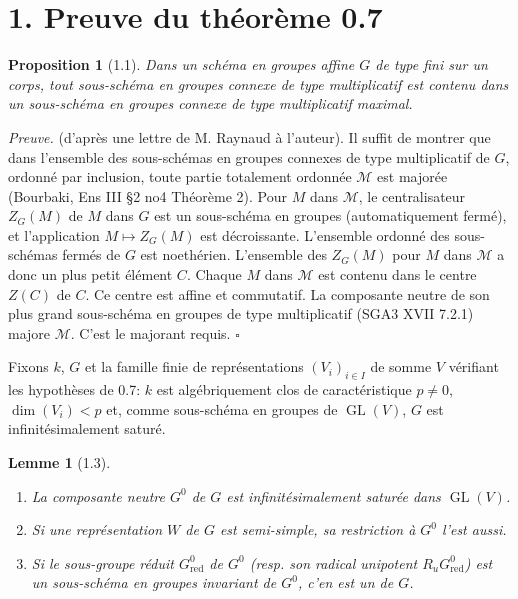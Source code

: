 \documentclass[10pt]{article}
\newcommand{\GL}{\operatorname{GL}}
\newcommand{\Ru}{R_u}
\newcommand{\red}{\mathrm{red}}
\theoremstyle{deligne}
\newtheorem*{proposition*}{Proposition}
\newtheorem*{lemma*}{Lemme}
\newenvironment{proofdel}{\textit{Preuve.}}{\hfill$\square$}
\newcommand{\heading}[1]{\vspace{0.7em}\noindent{\bfseries #1}\quad}
\begin{document}
\section*{1. Preuve du théorème 0.7}

\begin{proposition*}[1.1]
Dans un schéma en groupes affine \(G\) de type fini sur un corps, tout sous-schéma en groupes connexe de type multiplicatif est contenu dans un sous-schéma en groupes connexe de type multiplicatif maximal.
\end{proposition*}

\begin{proofdel}
(d'après une lettre de M. Raynaud à l'auteur). Il suffit de montrer que dans l'ensemble des sous-schémas en groupes connexes de type multiplicatif de \(G\), ordonné par inclusion, toute partie totalement ordonnée \(\mathcal M\) est majorée (Bourbaki, Ens III §2 no4 Théorème 2). Pour \(M\) dans \(\mathcal M\), le centralisateur \(Z_G(M)\) de \(M\) dans \(G\) est un sous-schéma en groupes (automatiquement fermé), et l'application \(M\mapsto Z_G(M)\) est décroissante. L'ensemble ordonné des sous-schémas fermés de \(G\) est noethérien. L'ensemble des \(Z_G(M)\) pour \(M\) dans \(\mathcal M\) a donc un plus petit élément \(C\). Chaque \(M\) dans \(\mathcal M\) est contenu dans le centre \(Z(C)\) de \(C\). Ce centre est affine et commutatif. La composante neutre de son plus grand sous-schéma en groupes de type multiplicatif (SGA3 XVII 7.2.1) majore \(\mathcal M\). C'est le majorant requis.
\end{proofdel}

\heading{1.2.} Fixons \(k\), \(G\) et la famille finie de représentations \((V_i)_{i\in I}\) de somme \(V\) vérifiant les hypothèses de 0.7: \(k\) est algébriquement clos de caractéristique \(p\ne0\), \(\dim(V_i)<p\) et, comme sous-schéma en groupes de \(\GL(V)\), \(G\) est infinitésimalement saturé.

\begin{lemma*}[1.3]
\begin{enumerate}[label=(\roman*)]
\item La composante neutre \(G^0\) de \(G\) est infinitésimalement saturée dans \(\GL(V)\).
\item Si une représentation \(W\) de \(G\) est semi-simple, sa restriction à \(G^0\) l'est aussi.
\item Si le sous-groupe réduit \(G^0_{\red}\) de \(G^0\) (resp. son radical unipotent \(\Ru G^0_{\red}\)) est un sous-schéma en groupes invariant de \(G^0\), c'en est un de \(G\).
\end{enumerate}
\end{lemma*}
\end{document}
